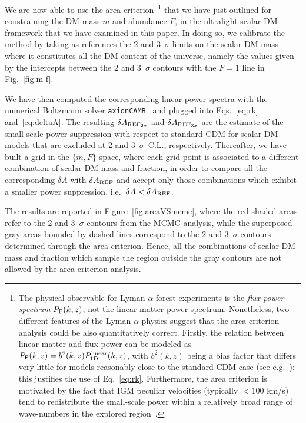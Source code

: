 \documentclass[11pt,nofootinbib]{article}
\numberwithin{equation}{section}
\begin{document}
We are now able to use the area criterion~\footnote
{The physical observable for Lyman-$\alpha$ forest experiments is the
\emph{flux power spectrum} $P_{\rm{F}}(k,z)$, not the linear
matter power spectrum. Nonetheless, two different features of the
Lyman-$\alpha$ physics suggest that the area criterion analysis could be 
also quantitatively correct. Firstly, the relation between linear matter
and flux power can be modeled as $P_{\rm{F}}(k,z)=b^2(k,z)P_{1\rm{D}}^{\rm{linear}}(k,z)$, with $b^2(k,z)$ being a bias factor that differs very little for models reasonably close to the standard CDM case (see e.g.~\cite{Viel2005}): this justifies the use of Eq.~\eqref{eq:rk}. Furthermore, the area criterion is motivated by the fact that IGM peculiar velocities (typically $<100$ km/s) tend to redistribute the small-scale power within a relatively broad range of wave-numbers in the explored region~\cite{gnedin2002}.}
that we have just outlined for constraining the DM mass $m$ and abundance $F$, in the ultralight scalar DM framework that we have examined in this paper. In doing so, we calibrate the method by taking as references the 2 and 3~$\sigma$ limits on the scalar DM mass where it constitutes all the DM content of the universe, namely the values given by the intercepts between the 2 and 3~$\sigma$ contours with the $F=1$ line in Fig.~\ref{fig:m-f}.  

We have then computed the corresponding linear power spectra with the numerical Boltzmann solver {\tt axionCAMB}~\cite{Hlozek:2014lca} and plugged into Eqs.~\eqref{eq:rk} and~\eqref{eq:deltaA}. The resulting $\delta A_{\rm REF_{2\sigma}}$ and $\delta A_{\rm REF_{3\sigma}}$ are the estimate of the small-scale power suppression with respect to standard CDM for scalar DM models that are excluded at 2 and 3~$\sigma$~C.L., respectively.
Thereafter, we have built a grid in the $\{m , F\}$-space, where each grid-point is associated to a different combination of scalar DM mass and fraction, in order to compare all the corresponding $\delta A$ with $\delta A_{\rm REF}$ and accept only those combinations which exhibit a smaller power suppression, i.e.~$\delta A < \delta A_{\rm REF}$.

 The results are reported in Figure~\ref{fig:areaVSmcmc},
where the red shaded areas refer to the 2 and 3~$\sigma$ contours from
the MCMC analysis, while the superposed gray areas bounded by dashed
lines correspond to the 2 and 3~$\sigma$ contours determined through the area criterion. 
 Hence, all the combinations of scalar DM mass and fraction which sample the region outside the gray contours are not allowed by the area criterion analysis.
\end{document}
